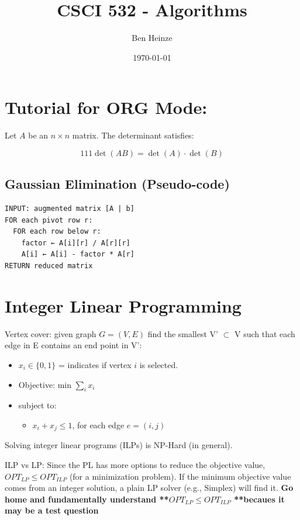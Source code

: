 \documentclass[11pt]{article}
\author{Ben Heinze}
\date{\today}
\title{CSCI 532 - Algorithms}
\begin{document}
\maketitle


\section{Tutorial for ORG Mode:}
\label{sec:org87e9fc3}

Let \(A\) be an \(n \times n\) matrix. The determinant satisfies:

\[111
  \det(AB) = \det(A) \cdot \det(B)
\]

\subsection{Gaussian Elimination (Pseudo-code)}
\label{sec:orgd296822}

\begin{verbatim}
INPUT: augmented matrix [A | b]
FOR each pivot row r:
  FOR each row below r:
    factor ← A[i][r] / A[r][r]
    A[i] ← A[i] - factor * A[r]
RETURN reduced matrix
\end{verbatim}

\section{Integer Linear Programming}
\label{sec:orgdf4ebaa}

Vertex cover: given graph \(G = (V,E)\) find the smallest V' \(\subset\) V such that each edge in E contains an end point in V':
\begin{itemize}
\item \(x_i \in \{0,1\}\) = indicates if vertex \(i\) is selected.
\item Objective: min \(\sum_i x_i\)
\item subject to:
\begin{itemize}
\item \(x_i + x_j \leq 1\), for each edge \(e = (i,j)\)
\end{itemize}
\end{itemize}

Solving integer linear programs (ILPs) is NP-Hard (in general).

ILP vs LP:
Since the PL has more options to reduce the objective value, \(OPT_{LP} \leq OPT_{ILP}\) (for a minimization problem). If the minimum objective value comes from an integer solution, a plain LP solver (e.g., Simplex) will find it.
\textbf{\textbf{Go home and fundamentally understand **\(OPT_{LP} \leq OPT_{ILP}\) **becaues it may be a test question}}
\end{document}

